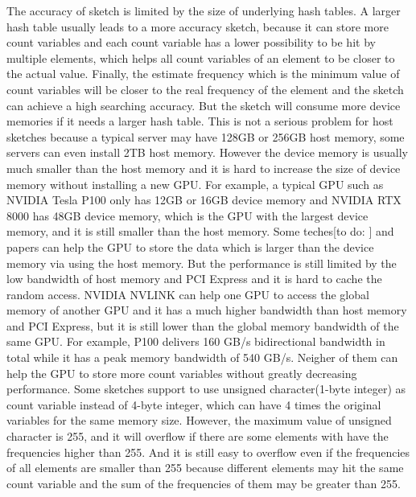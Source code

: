 \documentclass[conference]{IEEEtran}
\begin{document}

The accuracy of sketch is limited by the size of underlying hash tables. A larger hash table usually leads to a more accuracy sketch, because it can store more count variables and each count variable has a lower possibility to be hit by multiple elements, which helps all count variables of an element to be closer to the actual value. Finally, the estimate frequency which is the minimum value of count variables will be closer to the real frequency of the element and the sketch can achieve a high searching accuracy. But the sketch will consume more device memories if it needs a larger hash table. This is not a serious problem for host sketches because a typical server may have 128GB or 256GB host memory, some servers can even install 2TB host memory. However the device memory is usually much smaller than the host memory and it is hard to increase the size of device memory without installing a new GPU. For example, a typical GPU such as NVIDIA Tesla P100 only has 12GB or 16GB device memory and NVIDIA RTX 8000 has 48GB device memory, which is the GPU with the largest device memory, and it is still smaller than the host memory. Some teches[to do: ] and papers\cite{b4} can help the GPU to store the data which is larger than the device memory via using the host memory. But the performance is still limited by the low bandwidth of host memory and PCI Express and it is hard to cache the random access. NVIDIA NVLINK can help one GPU to access the global memory of another GPU and it has a much higher bandwidth than host memory and PCI Express, but it is still lower than the global memory bandwidth of the same GPU. For example, P100 delivers 160 GB/s bidirectional bandwidth in total while it has a peak memory bandwidth of 540 GB/s. Neigher of them can help the GPU to store more count variables without greatly decreasing performance.
Some sketches support to use unsigned character(1-byte integer) as count variable instead of 4-byte integer, which can have 4 times the original variables for the same memory size. However, the maximum value of unsigned character is 255, and it will overflow if there are some elements with have the frequencies higher than 255. And it is still easy to overflow even if the frequencies of all elements are smaller than 255 because different elements may hit the same count variable and the sum of the frequencies of them may be greater than 255.
\end{document}
